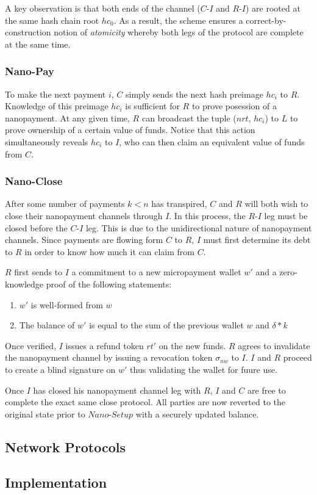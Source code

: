 A key observation is that both ends of the channel ($C$-$I$ and $R$-$I$)
are rooted at the same hash chain root $hc_0$. As a result, the scheme ensures
a correct-by-construction notion of \emph{atomicity} whereby both legs of the
protocol are complete at the same time.

\subsubsection{Nano-Pay}

To make the next payment $i$, $C$ simply sends the next hash preimage $hc_i$ to
$R$. Knowledge of this preimage $hc_i$ is sufficient for $R$ to prove posession
of a nanopayment. At any given time, $R$ can broadcast the tuple ($nrt$, $hc_i$)
to $L$ to prove ownership of a certain value of funds. Notice that this action
simultaneously reveals $hc_i$ to $I$, who can then claim an equivalent value of
funds from $C$.

\subsubsection{Nano-Close}

After some number of payments $k < n$ has transpired, $C$ and $R$ will both wish
to close their nanopayment channels through $I$. In this process, the $R$-$I$ leg
must be closed before the $C$-$I$ leg. This is due to the unidirectional nature
of nanopayment channels. Since payments are flowing form $C$ to $R$, $I$ must
first determine its debt to $R$ in order to know how much it can claim from $C$.

$R$ first sends to $I$ a commitment to a new micropayment wallet $w'$ and a
zero-knowledge proof of the following statements:

\begin{enumerate}
\item $w'$ is well-formed from $w$
\item The balance of $w'$ is equal to the sum of the previous wallet $w$ and
  $\delta * k$
\end{enumerate}

Once verified, $I$ issues a refund token $rt'$ on the new funds. $R$ agrees to
invalidate the nanopayment channel by issuing a revocation token $\sigma_{nw}$
to $I$. $I$ and $R$ proceed to create a blind signature on $w'$ thus validating
the wallet for fuure use.

Once $I$ has closed his nanopayment channel leg with $R$, $I$ and $C$ are free
to complete the exact same close protocol. All parties are now reverted to the
original state prior to $Nano$-$Setup$ with a securely updated balance.

\subsection{Network Protocols}

\subsection{Implementation}
